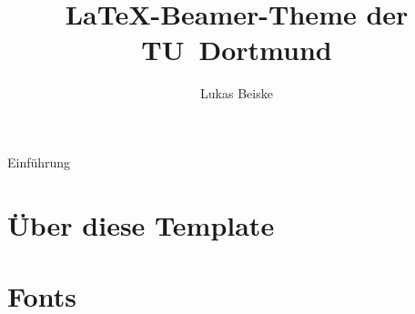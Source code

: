 \documentclass[aspectratio=1610, 9pt]{beamer}
\title{\LaTeX-Beamer-Theme der TU~Dortmund}
\author[L.~Beiske]{Lukas Beiske}
\institute[E5b]{E5b Astroteilchenphysik \\  Fakultät für Physik - TU Dortmund}
\begin{document}
\maketitle

\begin{frame}{Einführung}
  \tableofcontents
\end{frame}

\section{Über diese Template}


\section{Fonts}

\end{document}
